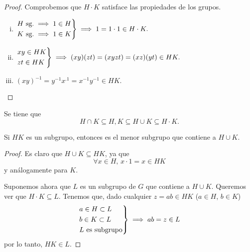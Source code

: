 \begin{proof}
    Comprobemos que $H \cdot K$ satisface las propiedades de los grupos.
    \begin{enumerate}[i)]
        \item 
            $
                \begin{rcases}
                    H \text{ sg.} \implies 1 \in H \\
                    K \text{ sg.} \implies 1 \in K
                \end{rcases}
                \implies 1 = 1\cdot 1 \in H \cdot K.
            $
        \item
            $
                \begin{rcases}
                    xy \in HK \\
                    zt \in HK
                \end{rcases}
                \implies (xy)(zt) = (xyzt) = (xz)(yt) \in HK.
            $
        \item
            $
                (xy)^{-1} = y^{-1} x^{.1} = x^{-1}y^{-1} \in HK.
            $
    \end{enumerate}
\end{proof}

\begin{obs}
    Se tiene que
    \[
        H \cap K \subseteq H, K \subseteq H \cup K \subseteq H \cdot K.
    \]
\end{obs}

\begin{obs}
    Si $HK$ es un subgrupo, entonces es el menor subgrupo que contiene a $H \cup K$. 
\end{obs}

\begin{proof}
    Es claro que $H \cup K \subseteq HK$, ya que
    \[
        \forall x \in H, \, x\cdot1 = x \in HK
    \]
    y análogamente para $K$.

    Suponemos ahora que $L$ es un subgrupo de $G$ que contiene a $H \cup K$. Queremos ver que
    $ H \cdot K \subseteq L$. Tenemos que, dado cualquier $z = ab \in HK$ ($a \in H$, $b \in K$)
    \[
        \begin{rcases}
            a \in H \subset L \\
            b \in K \subset L \\
            L \text{ es subgrupo}
        \end{rcases}
        \implies ab = z \in L
    \]
    por lo tanto, $HK \in L$.
\end{proof}

